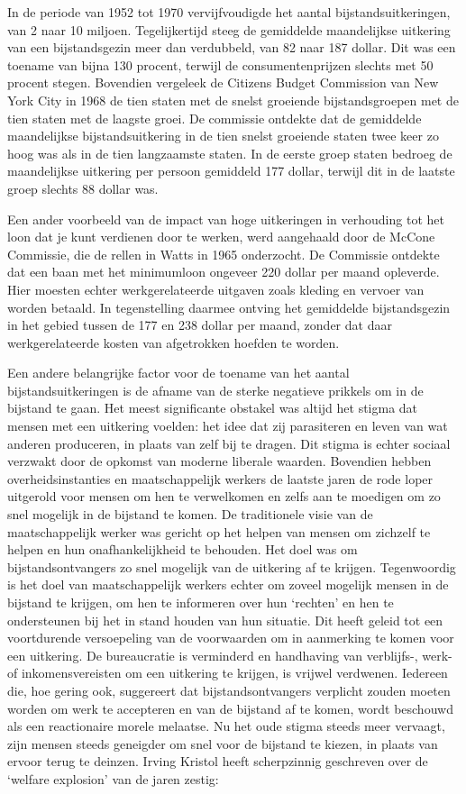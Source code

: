 \documentclass[
  a5paper,
  smalldemyvopaper,10pt,twoside,onecolumn,openright,extrafontsizes,hidelinks]{memoir}
\begin{document}
In de periode van 1952 tot 1970 vervijfvoudigde het aantal
bijstandsuitkeringen, van 2 naar 10 miljoen. Tegelijkertijd steeg de
gemiddelde maandelijkse uitkering van een bijstandsgezin meer dan
verdubbeld, van 82 naar 187 dollar. Dit was een toename van bijna 130
procent, terwijl de consumentenprijzen slechts met 50 procent stegen.
Bovendien vergeleek de Citizens Budget Commission van New York City in
1968 de tien staten met de snelst groeiende bijstandsgroepen met de tien
staten met de laagste groei. De commissie ontdekte dat de gemiddelde
maandelijkse bijstandsuitkering in de tien snelst groeiende staten twee
keer zo hoog was als in de tien langzaamste staten. In de eerste groep
staten bedroeg de maandelijkse uitkering per persoon gemiddeld 177
dollar, terwijl dit in de laatste groep slechts 88 dollar was.

Een ander voorbeeld van de impact van hoge uitkeringen in verhouding tot
het loon dat je kunt verdienen door te werken, werd aangehaald door de
McCone Commissie, die de rellen in Watts in 1965 onderzocht. De
Commissie ontdekte dat een baan met het minimumloon ongeveer 220 dollar
per maand opleverde. Hier moesten echter werkgerelateerde uitgaven zoals
kleding en vervoer van worden betaald. In tegenstelling daarmee ontving
het gemiddelde bijstandsgezin in het gebied tussen de 177 en 238 dollar
per maand, zonder dat daar werkgerelateerde kosten van afgetrokken
hoefden te worden.

Een andere belangrijke factor voor de toename van het aantal
bijstandsuitkeringen is de afname van de sterke negatieve prikkels om in
de bijstand te gaan. Het meest significante obstakel was altijd het
stigma dat mensen met een uitkering voelden: het idee dat zij
parasiteren en leven van wat anderen produceren, in plaats van zelf bij
te dragen. Dit stigma is echter sociaal verzwakt door de opkomst van
moderne liberale waarden. Bovendien hebben overheidsinstanties en
maatschappelijk werkers de laatste jaren de rode loper uitgerold voor
mensen om hen te verwelkomen en zelfs aan te moedigen om zo snel
mogelijk in de bijstand te komen. De traditionele visie van de
maatschappelijk werker was gericht op het helpen van mensen om zichzelf
te helpen en hun onafhankelijkheid te behouden. Het doel was om
bijstandsontvangers zo snel mogelijk van de uitkering af te krijgen.
Tegenwoordig is het doel van maatschappelijk werkers echter om zoveel
mogelijk mensen in de bijstand te krijgen, om hen te informeren over hun
`rechten' en hen te ondersteunen bij het in stand houden van hun
situatie. Dit heeft geleid tot een voortdurende versoepeling van de
voorwaarden om in aanmerking te komen voor een uitkering. De
bureaucratie is verminderd en handhaving van verblijfs-, werk- of
inkomensvereisten om een uitkering te krijgen, is vrijwel verdwenen.
Iedereen die, hoe gering ook, suggereert dat bijstandsontvangers
verplicht zouden moeten worden om werk te accepteren en van de bijstand
af te komen, wordt beschouwd als een reactionaire morele melaatse. Nu
het oude stigma steeds meer vervaagt, zijn mensen steeds geneigder om
snel voor de bijstand te kiezen, in plaats van ervoor terug te deinzen.
Irving Kristol heeft scherpzinnig geschreven over de `welfare explosion'
van de jaren zestig:
\end{document}
